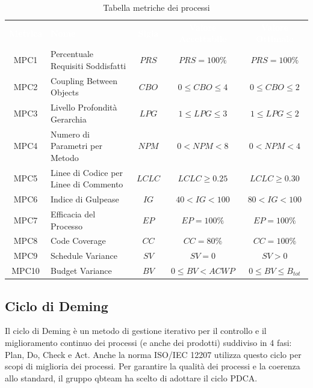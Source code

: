     \renewcommand{\arraystretch}{1.5}
    \begin{longtable}{ c C{4cm} c c c}
    \caption{Tabella metriche dei processi}\\
    \textcolor{white}{\textbf{Metrica}} & \textcolor{white}{\textbf{Nome}} & \textcolor{white}{\textbf{Sigla}} & \textcolor{white}{\textbf{Valore Accettabile}} & \textcolor{white}{\textbf{Valore Ottimale}}\\
    MPC1 & Percentuale Requisiti Soddisfatti & $PRS$ & $PRS=100\%$ & $PRS=100\%$ \\
    MPC2 & Coupling Between Objects & $CBO$ & $0 \leq CBO \leq 4$ & $0 \leq CBO \leq 2$ \\
    MPC3 & Livello Profondità Gerarchia & $LPG$ &  $1 \leq LPG \leq 3$ &  $1 \leq LPG \leq 2$ \\
    MPC4 & Numero di Parametri per Metodo & $NPM$ & $0 < NPM < 8$ & $ 0 < NPM < 4$ \\
    MPC5 & Linee di Codice per Linee di Commento & $LCLC$ & $LCLC \geq 0.25$ & $LCLC \geq 0.30$ \\
    MPC6 & Indice di Gulpease & $IG$ & $40 < IG < 100$ & $80 < IG < 100$ \\
    MPC7 & Efficacia del Processo & $EP$ & $EP = 100\%$ & $EP = 100\%$ \\
    MPC8 & Code Coverage & $CC$ & $CC = 80\%$ & $CC = 100\%$  \\
    MPC9 & Schedule Variance & $SV$ & $SV = 0$ & $SV > 0$  \\	
    MPC10 & Budget Variance & $BV$ & $0 \leq BV < ACWP$ & $0 \leq BV \leq B_{tot}$  \\
    \end{longtable}

\subsection{Ciclo di Deming}
    Il ciclo di Deming è un metodo di gestione iterativo per il controllo e il miglioramento continuo dei processi (e anche dei prodotti) suddiviso in 4 fasi: Plan, Do, Check e Act. 
    Anche la norma ISO/IEC 12207 utilizza questo ciclo per scopi di miglioria dei processi. Per garantire la qualità dei processi e la coerenza allo standard, il gruppo qbteam 
    ha scelto di adottare il ciclo PDCA.

